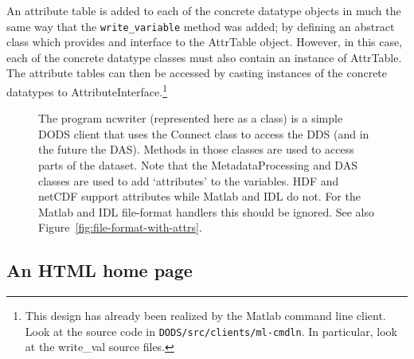 \documentclass{article}
\newcommand{\dap}{\rm {\small DAP}\raise.5ex\hbox{\footnotesize ++}\xspace}
\begin{document}
An attribute table is added to each of the concrete datatype objects in much
the same way that the \texttt{write\_variable} method was added; by defining
an abstract class which provides and interface to the AttrTable object.
However, in this case, each of the concrete datatype classes must also
contain an instance of AttrTable. The attribute tables can then be accessed
by casting instances of the concrete datatypes to
AttributeInterface.\footnote{This design has already been realized by the
  Matlab command line client. Look at the source code in
  \texttt{DODS/src/clients/ml-cmdln}. In particular, look at the write\_val
  source files.}

\begin{figure}[h]
\begin{center}
\caption{The program ncwriter (represented here as a class) is a simple DODS
  client that uses the Connect class to access the DDS (and in the future the
  DAS). Methods in those classes are used to access parts of the dataset.
  Note that the MetadataProcessing and DAS classes are used to add
  `attributes' to the variables. HDF and netCDF support attributes while
  Matlab and IDL do not. For the Matlab and IDL file-format handlers this
  should be ignored. See also Figure~\ref{fig:file-format-with-attrs}.}
\label{fig:file-format-main}
\end{center}
\end{figure}

\begin{sidewaysfigure}[h]
\begin{center}
\caption{Subclassing the \dap library's datatype hierarchy provides a way to
  write out variables. Even though the \texttt{print\_val} method was
  designed for printing ASCII representations of the variables, it can be used
  to write binary values, too}
\label{fig:file-format-types1}
\end{center}
\end{sidewaysfigure}

\begin{sidewaysfigure}[h]
\begin{center}
\caption{Adding attribute processing capabilities to the datatype classes.}
\label{fig:file-format-with-attrs}
\end{center}
\end{sidewaysfigure}

\subsection{An HTML home page}
\end{document}

